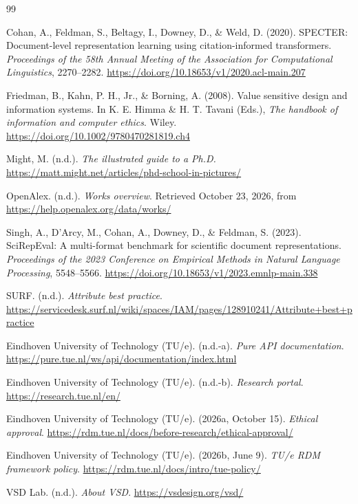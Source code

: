 \documentclass[11pt,a4paper]{article}
\begin{document}
\begin{thebibliography}{99}

Cohan, A., Feldman, S., Beltagy, I., Downey, D., \& Weld, D. (2020).
SPECTER: Document-level representation learning using citation-informed transformers.
\emph{Proceedings of the 58th Annual Meeting of the Association for Computational Linguistics}, 2270--2282.
\url{https://doi.org/10.18653/v1/2020.acl-main.207}

Friedman, B., Kahn, P. H., Jr., \& Borning, A. (2008).
Value sensitive design and information systems.
In K. E. Himma \& H. T. Tavani (Eds.), \emph{The handbook of information and computer ethics}. Wiley.
\url{https://doi.org/10.1002/9780470281819.ch4}

Might, M. (n.d.).
\emph{The illustrated guide to a Ph.D.}
\url{https://matt.might.net/articles/phd-school-in-pictures/}

OpenAlex. (n.d.).
\emph{Works overview}.
Retrieved October 23, 2026, from
\url{https://help.openalex.org/data/works/}

Singh, A., D'Arcy, M., Cohan, A., Downey, D., \& Feldman, S. (2023).
SciRepEval: A multi-format benchmark for scientific document representations.
\emph{Proceedings of the 2023 Conference on Empirical Methods in Natural Language Processing}, 5548--5566.
\url{https://doi.org/10.18653/v1/2023.emnlp-main.338}

SURF. (n.d.).
\emph{Attribute best practice}.
\url{https://servicedesk.surf.nl/wiki/spaces/IAM/pages/128910241/Attribute+best+practice}

Eindhoven University of Technology (TU/e). (n.d.-a).
\emph{Pure API documentation}.
\url{https://pure.tue.nl/ws/api/documentation/index.html}

Eindhoven University of Technology (TU/e). (n.d.-b).
\emph{Research portal}.
\url{https://research.tue.nl/en/}

Eindhoven University of Technology (TU/e). (2026a, October 15).
\emph{Ethical approval}.
\url{https://rdm.tue.nl/docs/before-research/ethical-approval/}

Eindhoven University of Technology (TU/e). (2026b, June 9).
\emph{TU/e RDM framework policy}.
\url{https://rdm.tue.nl/docs/intro/tue-policy/}

VSD Lab. (n.d.).
\emph{About VSD}.
\url{https://vsdesign.org/vsd/}

\end{thebibliography}
\end{document}
